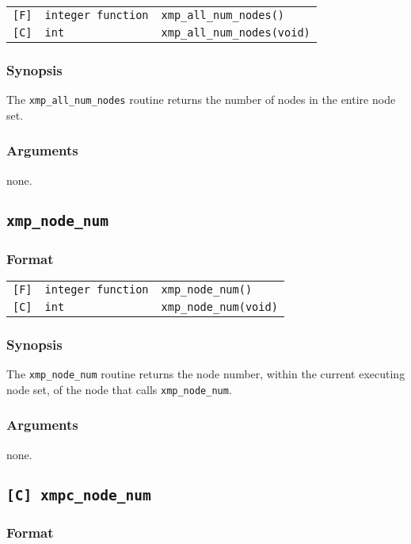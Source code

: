 \begin{tabular}{lll}
\verb![F]!&  {\tt integer function}& {\tt xmp\_all\_num\_nodes()}\\
\verb![C]!&  {\tt int}& {\tt xmp\_all\_num\_nodes(void)}
\end{tabular}

\subsubsection*{Synopsis}
The {\tt xmp\_all\_num\_nodes} routine returns the number of nodes
in the entire node set.

\subsubsection*{Arguments}
none.

\subsection{\tt xmp\_node\_num}

\subsubsection*{Format}

\begin{tabular}{lll}
\verb![F]!&  {\tt integer function}& {\tt xmp\_node\_num()}\\
\verb![C]!&  {\tt int}& {\tt xmp\_node\_num(void)}
\end{tabular}

\subsubsection*{Synopsis}
The {\tt xmp\_node\_num} routine returns the node number,
within the current executing node set, of the node that calls {\tt xmp\_node\_num}.

\subsubsection*{Arguments}
none.

\subsection{\tt [C] xmpc\_node\_num}\label{sub:xmpcnodenum}

\subsubsection*{Format}

